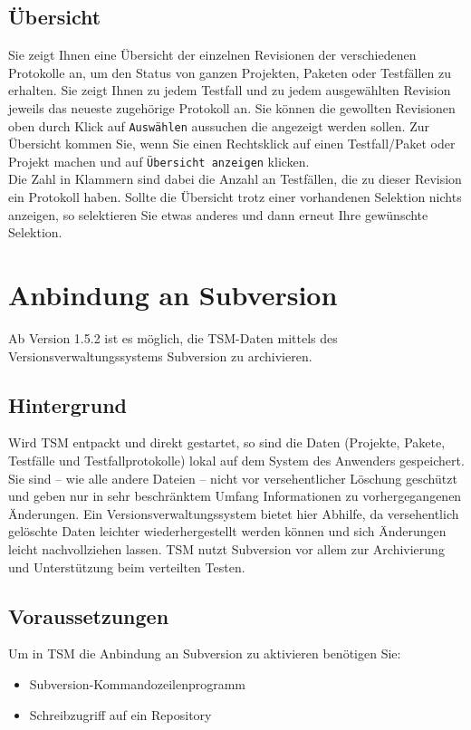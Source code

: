 \documentclass[11pt,a4paper,titlepage]{article}
\begin{document}
\subsection{Übersicht}
Sie zeigt Ihnen eine Übersicht der einzelnen Revisionen der verschiedenen Protokolle an, um den Status von ganzen Projekten, Paketen oder Testfällen zu erhalten.
Sie zeigt Ihnen zu jedem Testfall und zu jedem ausgewählten Revision jeweils das neueste zugehörige Protokoll an.
Sie können die gewollten Revisionen oben durch Klick auf \texttt{Auswählen} aussuchen die angezeigt werden sollen.
Zur Übersicht kommen Sie, wenn Sie einen Rechtsklick auf einen Testfall/Paket oder Projekt machen und auf \texttt{Übersicht anzeigen} klicken.\\
Die Zahl in Klammern sind dabei die Anzahl an Testfällen, die zu dieser Revision ein Protokoll haben.
Sollte die Übersicht trotz einer vorhandenen Selektion nichts anzeigen, so selektieren Sie etwas anderes und dann erneut Ihre gewünschte Selektion.

\section{Anbindung an Subversion}
Ab Version 1.5.2 ist es möglich, die TSM-Daten mittels des Versionsverwaltungssystems Subversion zu archivieren.

\subsection{Hintergrund}
Wird TSM entpackt und direkt gestartet, so sind die Daten (Projekte, Pakete, Testfälle und Testfallprotokolle) lokal auf dem System des Anwenders gespeichert.
Sie sind -- wie alle andere Dateien -- nicht vor versehentlicher Löschung geschützt und geben nur in sehr beschränktem Umfang Informationen zu vorhergegangenen Änderungen.
Ein Versionsverwaltungssystem bietet hier Abhilfe, da versehentlich gelöschte Daten leichter wiederhergestellt werden können und sich Änderungen leicht nachvollziehen lassen.
TSM nutzt Subversion vor allem zur Archivierung und Unterstützung beim verteilten Testen.

\subsection{Voraussetzungen}
Um in TSM die Anbindung an Subversion zu aktivieren benötigen Sie:
\begin{itemize}
 \item Subversion-Kommandozeilenprogramm
 \item Schreibzugriff auf ein Repository
\end{itemize}
\end{document}
